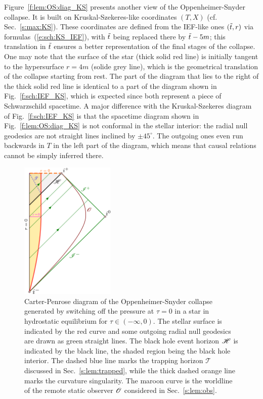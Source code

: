 Figure~\ref{f:lem:OS:diag_KS} presents another view of the Oppenheimer-Snyder collapse.
It is built on Kruskal-Szekeres-like coordinates
$(T,X)$ (cf. Sec.~\ref{s:max:KS}). These coordinates are defined from the IEF-like ones $({\tilde t}, r)$ via formulas~(\ref{e:sch:KS_IEF}), with ${\tilde t}$ being replaced there by ${\tilde t} - 5 m$; this
translation in ${\tilde t}$ ensures a better representation of the final
stages of the collapse. One may note that the surface of the star (thick solid red line) is initially
tangent to the hypersurface $r=4 m$ (solide grey line), which is the geometrical translation
of the collapse starting from rest. The part of the diagram that lies to the right of the
thick solid red line is identical to a part of the diagram shown in Fig.~\ref{f:sch:IEF_KS}, which
is expected since both represent a piece of Schwarzschild spacetime. A major difference with
the Kruskal-Szekeres diagram of Fig.~\ref{f:sch:IEF_KS} is that the spacetime diagram shown
in Fig.~\ref{f:lem:OS:diag_KS} is not conformal in the stellar interior: the radial null geodesics
are not straight lines inclined by $\pm 45^\circ$. The outgoing ones even run backwards in $T$
in the left part of the diagram, which means that causal relations cannot be simply inferred there.


\begin{figure}
\centerline{\includegraphics[width=0.4\textwidth]{lem_OS_CP_diag.pdf}}
\caption[]{\label{f:lem:OS:CP_diag} \footnotesize
Carter-Penrose diagram of the Oppenheimer-Snyder collapse generated
by switching off the pressure at $\tau=0$ in a star
in hydrostatic equilibrium for $\tau \in (-\infty,0)$.
The stellar surface is indicated by the red curve and some outgoing radial
null geodesics are drawn as green straight lines.
The black hole event horizon $\mathscr{H}$ is indicated by
the black line, the shaded region being the black hole interior.
The dashed blue line marks the trapping horizon
$\mathscr{T}$ discussed in Sec.~\ref{s:lem:trapped},
while the thick dashed orange line marks the curvature singularity.
The maroon curve is the worldline of the remote
static observer $\mathscr{O}$ considered in Sec.~\ref{s:lem:obs}.
}
\end{figure}

